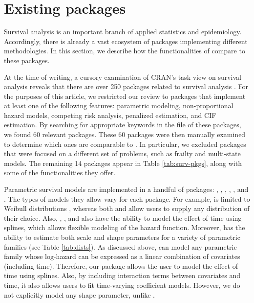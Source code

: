 \documentclass[
]{jss}
\begin{document}
\hypertarget{existing-packages}{%
\section{Existing packages}\label{existing-packages}}

Survival analysis is an important branch of applied statistics and
epidemiology. Accordingly, there is already a vast ecosystem of 
packages implementing different methodologies. In this section, we
describe how the functionalities of  compare to these
packages.

At the time of writing, a cursory examination of CRAN's task view on
survival analysis reveals that there are over 250 packages related to
survival analysis \citeyearpar{survTaskView}. For the purposes of this
article, we restricted our review to packages that implement at least
one of the following features: parametric modeling, non-proportional
hazard models, competing risk analysis, penalized estimation, and CIF
estimation. By searching for appropriate keywords in the
 file of these packages, we found 60 relevant
packages. These 60 packages were then manually examined to determine
which ones are comparable to . In particular, we excluded
packages that were focused on a different set of problems, such as
frailty and multi-state models. The remaining 14 packages appear in
Table \ref{tab:surv-pkgs}, along with some of the functionalities they
offer.

Parametric survival models are implemented in a handful of packages:
 \citeyearpar{mahani2015bayesian}, 
\citeyearpar{flexsurv},  \citeyearpar{smoothHazard},
 \citeyearpar{clements_liu}, 
\citeyearpar{scheike2014estimating}, and 
\citeyearpar{survival-package}. The types of models they allow vary for
each package. For example,  is limited to Weibull
distributions \citeyearpar{smoothHazard}, whereas both 
and  allow users to supply any distribution of their
choice. Also, , ,  and
 also have the ability to model the effect of time using
splines, which allows flexible modeling of the hazard function.
Moreover,  has the ability to estimate both scale and
shape parameters for a variety of parametric families (see Table
\ref{tab:dists}). As discussed above,  can model any
parametric family whose log-hazard can be expressed as a linear
combination of covariates (including time). Therefore, our package
allows the user to model the effect of time using splines. Also, by
including interaction terms between covariates and time, it also allows
users to fit time-varying coefficient models. However, we do not
explicitly model any shape parameter, unlike .
\end{document}
